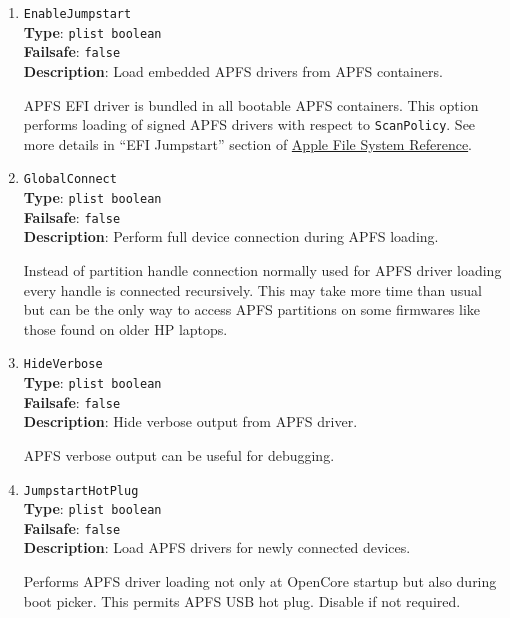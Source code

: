 \documentclass[]{article}
\begin{document}
\begin{enumerate}

\item
  \texttt{EnableJumpstart}\\
  \textbf{Type}: \texttt{plist\ boolean}\\
  \textbf{Failsafe}: \texttt{false}\\
  \textbf{Description}: Load embedded APFS drivers from APFS containers.

  APFS EFI driver is bundled in all bootable APFS containers. This
  option performs loading of signed APFS drivers with respect to
  \texttt{ScanPolicy}. See more details in ``EFI Jumpstart'' section of
  \href{https://developer.apple.com/support/apple-file-system/Apple-File-System-Reference.pdf}{Apple File System Reference}.


\item
  \texttt{GlobalConnect}\\
  \textbf{Type}: \texttt{plist\ boolean}\\
  \textbf{Failsafe}: \texttt{false}\\
  \textbf{Description}: Perform full device connection during APFS loading.

  Instead of partition handle connection normally used for APFS driver loading
  every handle is connected recursively. This may take more time than usual
  but can be the only way to access APFS partitions on some firmwares like
  those found on older HP laptops.

\item
  \texttt{HideVerbose}\\
  \textbf{Type}: \texttt{plist\ boolean}\\
  \textbf{Failsafe}: \texttt{false}\\
  \textbf{Description}: Hide verbose output from APFS driver.

  APFS verbose output can be useful for debugging.

\item
  \texttt{JumpstartHotPlug}\\
  \textbf{Type}: \texttt{plist\ boolean}\\
  \textbf{Failsafe}: \texttt{false}\\
  \textbf{Description}: Load APFS drivers for newly connected devices.

  Performs APFS driver loading not only at OpenCore startup but also
  during boot picker. This permits APFS USB hot plug. Disable if not
  required.


\end{enumerate}
\end{document}
